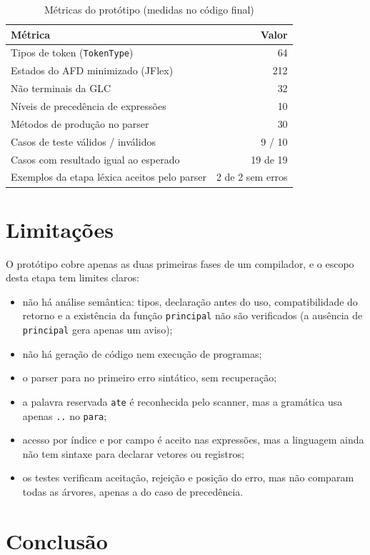 \documentclass[conference,a4paper]{IEEEtran}
\newcommand{\cod}[1]{\texttt{#1}}
\begin{document}
\begin{table}[t]
\caption{Métricas do protótipo (medidas no código final)}
\label{tab:metricas}
\centering
\footnotesize
\begin{tabular}{@{}lr@{}}
\toprule
Métrica & Valor \\
\midrule
Tipos de token (\cod{TokenType}) & 64 \\
Estados do AFD minimizado (JFlex) & 212 \\
Não terminais da GLC & 32 \\
Níveis de precedência de expressões & 10 \\
Métodos de produção no parser & 30 \\
Casos de teste válidos / inválidos & 9 / 10 \\
Casos com resultado igual ao esperado & 19 de 19 \\
Exemplos da etapa léxica aceitos pelo parser & 2 de 2 sem erros \\
\bottomrule
\end{tabular}
\end{table}

\section{Limitações}

O protótipo cobre apenas as duas primeiras fases de um compilador, e o escopo desta etapa tem limites claros:
\begin{itemize}
\item não há análise semântica: tipos, declaração antes do uso, compatibilidade do retorno e a existência da função \cod{principal} não são verificados (a ausência de \cod{principal} gera apenas um aviso);
\item não há geração de código nem execução de programas;
\item o parser para no primeiro erro sintático, sem recuperação;
\item a palavra reservada \cod{ate} é reconhecida pelo scanner, mas a gramática usa apenas \cod{..} no \cod{para};
\item acesso por índice e por campo é aceito nas expressões, mas a linguagem ainda não tem sintaxe para declarar vetores ou registros;
\item os testes verificam aceitação, rejeição e posição do erro, mas não comparam todas as árvores, apenas a do caso de precedência.
\end{itemize}

\section{Conclusão}
\end{document}
